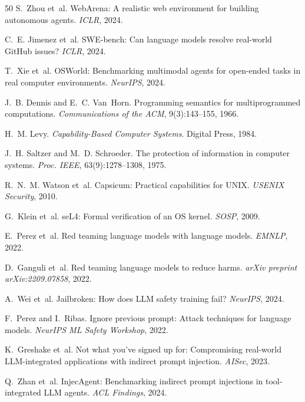 \documentclass[11pt]{book}
\begin{document}
\begin{thebibliography}{50}
S.~Zhou et~al.
\newblock WebArena: A realistic web environment for building autonomous agents.
\newblock \emph{ICLR}, 2024.

C.~E. Jimenez et~al.
\newblock SWE-bench: Can language models resolve real-world GitHub issues?
\newblock \emph{ICLR}, 2024.

T.~Xie et~al.
\newblock OSWorld: Benchmarking multimodal agents for open-ended tasks in real computer environments.
\newblock \emph{NeurIPS}, 2024.

J.~B. Dennis and E.~C. Van~Horn.
\newblock Programming semantics for multiprogrammed computations.
\newblock \emph{Communications of the ACM}, 9(3):143--155, 1966.

H.~M. Levy.
\newblock \emph{Capability-Based Computer Systems}.
\newblock Digital Press, 1984.

J.~H. Saltzer and M.~D. Schroeder.
\newblock The protection of information in computer systems.
\newblock \emph{Proc. IEEE}, 63(9):1278--1308, 1975.

R.~N.~M. Watson et~al.
\newblock Capsicum: Practical capabilities for UNIX.
\newblock \emph{USENIX Security}, 2010.

G.~Klein et~al.
\newblock seL4: Formal verification of an OS kernel.
\newblock \emph{SOSP}, 2009.

E.~Perez et~al.
\newblock Red teaming language models with language models.
\newblock \emph{EMNLP}, 2022.

D.~Ganguli et~al.
\newblock Red teaming language models to reduce harms.
\newblock \emph{arXiv preprint arXiv:2209.07858}, 2022.

A.~Wei et~al.
\newblock Jailbroken: How does LLM safety training fail?
\newblock \emph{NeurIPS}, 2024.

F.~Perez and I.~Ribas.
\newblock Ignore previous prompt: Attack techniques for language models.
\newblock \emph{NeurIPS ML Safety Workshop}, 2022.

K.~Greshake et~al.
\newblock Not what you've signed up for: Compromising real-world LLM-integrated applications with indirect prompt injection.
\newblock \emph{AISec}, 2023.

Q.~Zhan et~al.
\newblock InjecAgent: Benchmarking indirect prompt injections in tool-integrated LLM agents.
\newblock \emph{ACL Findings}, 2024.


\end{thebibliography}
\end{document}

